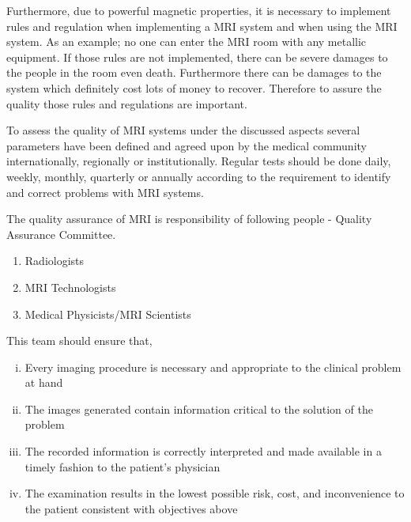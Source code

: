 \documentclass[12pt]{article}
\begin{document}
Furthermore, due to powerful magnetic properties, it is necessary to implement rules and regulation when implementing a MRI system and when using the MRI system. As an example; no one can enter the MRI room with any metallic equipment. If those rules are not implemented, there can be severe damages to the people in the room even death. Furthermore there can be damages to the system which definitely cost lots of money to recover. Therefore to assure the quality those rules and regulations are important. 

To assess the quality of MRI systems under the discussed aspects several parameters have been defined and agreed upon by the medical community internationally, regionally or institutionally. Regular tests should be done daily, weekly, monthly, quarterly or annually according to the requirement to identify and correct problems with MRI systems. 

The quality assurance of MRI is responsibility of following people - Quality Assurance Committee. 
\begin{enumerate}
    \item Radiologists
    \item MRI Technologists
    \item Medical Physicists/MRI Scientists
\end{enumerate}
This team should ensure that,

\begin{enumerate}[i.]
    \item Every imaging procedure is necessary and appropriate to the clinical problem at hand
    \item The images generated contain information critical to the solution of the problem
    \item The recorded information is correctly interpreted and made available in a timely fashion to the patient’s physician
    \item The examination results in the lowest possible risk, cost, and inconvenience to the patient consistent with objectives above
\end{enumerate}
\end{document}
